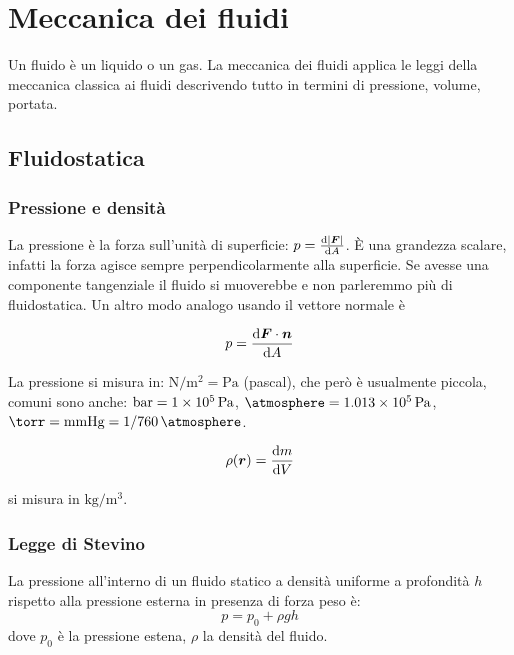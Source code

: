 \chapter{Meccanica dei fluidi}
\minitoc
Un fluido è un liquido o un gas. La meccanica dei fluidi applica le leggi della meccanica classica ai fluidi descrivendo tutto in termini di pressione, volume, portata.
\section{Fluidostatica}
\subsection{Pressione e densità}
La pressione è la forza sull'unità di superficie: $p=\frac{\mathrm{d} |\boldsymbol{F}|}{\mathrm{d} A}$. \`E una grandezza scalare, infatti la forza agisce sempre perpendicolarmente alla superficie. Se avesse una componente tangenziale il fluido si muoverebbe e non parleremmo più di fluidostatica. Un altro modo analogo usando il vettore normale è
\begin{Def}[pressione]
   \begin{equation}
      p=\frac{\mathrm{d}\boldsymbol{F}\cdot \boldsymbol{n}}{\mathrm{d} A}
   \end{equation}
\end{Def}
La pressione si misura in: $\si{\newton\per\meter\squared}=\si{\pascal}$ (pascal), che però è usualmente piccola,
comuni sono anche: $\si{\bar}=\SI{1E5}{\pascal}$,
$\si{\atmosphere}=\SI{1.013E5}{\pascal}$,
$\si{\torr}=\text{mmHg}=\SI[parse-numbers = false]{1/760}{\atmosphere}$. %
\begin{Def}
   \begin{equation}
      \rho(\boldsymbol{r})=\frac{\mathrm{d} m}{\mathrm{d} V}
   \end{equation}
\end{Def}
si misura in $\si{\kilogram/\metre^3}$.

\subsection{Legge di Stevino}
\begin{legge}[Stevino]
   La pressione all'interno di un fluido statico a densità uniforme a profondità $h$ rispetto alla pressione esterna in presenza di forza peso è:
   \begin{equation}
      p = p_0 + \rho g h
   \end{equation}
   dove $p_0$ è la pressione estena, $\rho$ la densità del fluido.
\end{legge}

